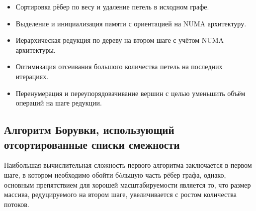 \documentclass{article}
\begin{document}
\begin{itemize}
    \item Сортировка рёбер по весу и удаление петель в исходном графе.
    \item Выделение и инициализация памяти с ориентацией на NUMA архитектуру.
    \item Иерархическая редукция по дереву на втором шаге с учётом NUMA архитектуры.
    \item Оптимизация отсеивания большого количества петель на последних итерациях.
    \item Перенумерация и переупорядовачивание вершин с целью уменьшить объём операций на шаге редукции.
\end{itemize}




\subsection{Алгоритм Борувки, использующий отсортированные списки смежности}
Наибольшая вычислительная сложность первого алгоритма заключается в первом шаге, в котором необходимо обойти б\`oльшую часть рёбер графа, однако, основным препятствием для хорошей масштабируемости является то, что размер массива, редуцируемого на втором шаге, увеличивается с ростом количества потоков.
\end{document}
